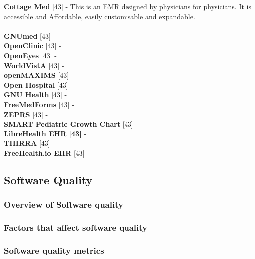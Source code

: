 \documentclass[a4paper]{article}
\begin{document}
{\bf Cottage Med} [43] - This is an EMR designed by physicians for physicians. It is accessible and Affordable, easily customisable and expandable.\\ \\

{\bf GNUmed} [43] - \\
{\bf OpenClinic} [43] - \\
{\bf OpenEyes} [43] - \\
{\bf WorldVistA} [43] - \\
{\bf openMAXIMS} [43] - \\
{\bf Open Hospital} [43] - \\
{\bf GNU Health} [43] - \\
{\bf FreeMedForms} [43] - \\
{\bf ZEPRS} [43] - \\
{\bf SMART Pediatric Growth Chart} [43] - \\
{\bf LibreHealth EHR [43]} - \\
{\bf THIRRA} [43] - \\
{\bf FreeHealth.io EHR} [43] - \\


\subsection{Software Quality}



\subsubsection{Overview of Software quality}

\subsubsection{Factors that affect software quality}

\subsubsection{Software quality metrics}
\end{document}
